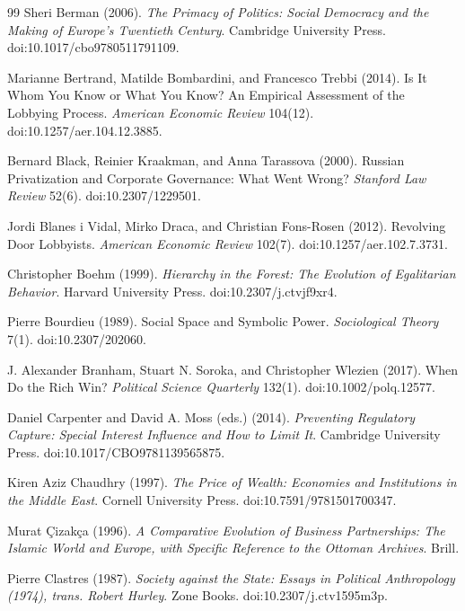 \documentclass[11pt,letterpaper]{article}
\theoremstyle{definition}
\theoremstyle{remark}
\begin{document}
\begin{thebibliography}{99}
Sheri Berman (2006). \emph{The Primacy of Politics: Social Democracy and the Making of Europe's Twentieth Century}. Cambridge University Press. doi:10.1017/cbo9780511791109.

Marianne Bertrand, Matilde Bombardini, and Francesco Trebbi (2014). Is It Whom You Know or What You Know? An Empirical Assessment of the Lobbying Process. \emph{American Economic Review} 104(12). doi:10.1257/aer.104.12.3885.

Bernard Black, Reinier Kraakman, and Anna Tarassova (2000). Russian Privatization and Corporate Governance: What Went Wrong? \emph{Stanford Law Review} 52(6). doi:10.2307/1229501.

Jordi Blanes i Vidal, Mirko Draca, and Christian Fons-Rosen (2012). Revolving Door Lobbyists. \emph{American Economic Review} 102(7). doi:10.1257/aer.102.7.3731.

Christopher Boehm (1999). \emph{Hierarchy in the Forest: The Evolution of Egalitarian Behavior}. Harvard University Press. doi:10.2307/j.ctvjf9xr4.

Pierre Bourdieu (1989). Social Space and Symbolic Power. \emph{Sociological Theory} 7(1). doi:10.2307/202060.

J. Alexander Branham, Stuart N. Soroka, and Christopher Wlezien (2017). When Do the Rich Win? \emph{Political Science Quarterly} 132(1). doi:10.1002/polq.12577.

Daniel Carpenter and David A. Moss (eds.) (2014). \emph{Preventing Regulatory Capture: Special Interest Influence and How to Limit It}. Cambridge University Press. doi:10.1017/CBO9781139565875.

Kiren Aziz Chaudhry (1997). \emph{The Price of Wealth: Economies and Institutions in the Middle East}. Cornell University Press. doi:10.7591/9781501700347.

Murat \c{C}izak\c{c}a (1996). \emph{A Comparative Evolution of Business Partnerships: The Islamic World and Europe, with Specific Reference to the Ottoman Archives}. Brill.

Pierre Clastres (1987). \emph{Society against the State: Essays in Political Anthropology (1974), trans. Robert Hurley}. Zone Books. doi:10.2307/j.ctv1595m3p.


\end{thebibliography}
\end{document}
